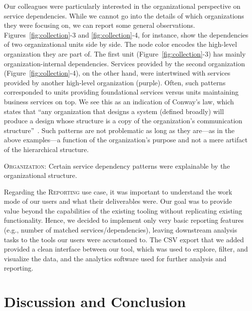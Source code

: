 \documentclass[conference]{IEEEtran}
\begin{document}
Our colleagues were particularly interested in the organizational perspective on service dependencies.
While we cannot go into the details of which organizations they were focusing on, we can report some general observations.
Figures~\ref{fig:collection}-3 and \ref{fig:collection}-4, for instance, show the dependencies of two organizational units side by side.
The node color encodes the high-level organization they are part of.
The first unit (Figure~\ref{fig:collection}-3) has mainly organization-internal dependencies.
Services provided by the second organization (Figure~\ref{fig:collection}-4), on the other hand, were intertwined with services provided by another high-level organization (purple).
Often, such patterns corresponded to units providing foundational services versus units maintaining business services on top.
We see this as an indication of Conway's law, which states that ``any organization that designs a system (defined broadly) will produce a design whose structure is a copy of the organization's communication structure''~\cite{Conway1968}.
Such patterns are not problematic as long as they are---as in the above examples---a function of the organization's purpose and not a mere artifact of the hierarchical structure.

\begin{roundedbox}
\noindent\textsc{Organization}: Certain service dependency patterns were explainable by the organizational structure.
\end{roundedbox}

Regarding the \textsc{Reporting} use case, it was important to understand the work mode of our users and what their deliverables were.
Our goal was to provide value beyond the capabilities of the existing tooling without replicating existing functionality.
Hence, we decided to implement only very basic reporting features (e.g., number of matched services/dependencies), leaving downstream analysis tasks to the tools our users were accustomed to.
The CSV export that we added provided a clean interface between our tool, which was used to explore, filter, and visualize the data, and the analytics software used for further analysis and reporting.

\section{Discussion and Conclusion}
\end{document}
